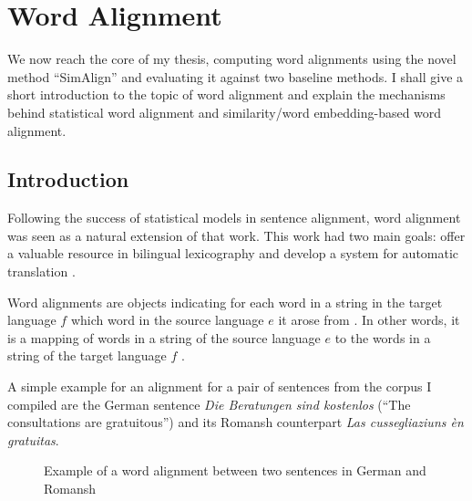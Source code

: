 \chapter{Word Alignment}\label{chap:word-alignment}

We now reach the core of my thesis, computing word alignments using the novel method \enquote{SimAlign} \autocite{jalili-sabet-etal-2020-simalign} and evaluating it against two baseline methods. I shall give a short introduction to the topic of word alignment and explain the mechanisms behind statistical word alignment and  similarity/word embedding-based word alignment.

\section{Introduction}
Following the success of statistical models in sentence alignment, word alignment was seen as a natural extension of that work. 
This work had two main goals: offer a valuable resource in bilingual lexicography and develop a system for automatic translation \autocite{brown-etal-1993-mathematics}. 

Word alignments are objects indicating for each word in a string in the target language \(f\) which word in the source language \(e\) it arose from \autocite{brown-etal-1993-mathematics}. 
In other words, it is a mapping of words in a string of the source language \(e\) to the words in a string of the target language \(f\) \autocite[84]{koehn2009}.

A simple example for an alignment for a pair of sentences from the corpus I compiled are the German sentence \emph{Die Beratungen sind kostenlos} (\enquote{The consultations are gratuitous}) and its Romansh counterpart \emph{Las cussegliaziuns èn gratuitas}. 


\begin{figure}[h]
\centering

    

\vspace*{1cm}

   
\caption[Word alignment example]{Example of a word alignment between two sentences in German and Romansh}
\end{figure}


